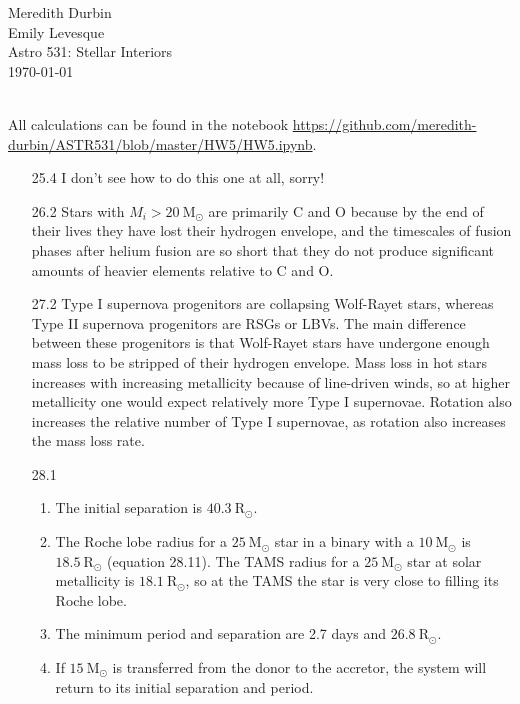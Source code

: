 \documentclass[11pt]{article}
\newcommand\rsol{\mathrm{R}_\odot}
\newcommand\msol{\mathrm{M}_\odot}
\begin{document}
\begin{flushright}Meredith Durbin\\
Emily Levesque\\
Astro 531: Stellar Interiors\\
\today\\

\end{flushright}

 \\[6pt]

All calculations can be found in the notebook \url{https://github.com/meredith-durbin/ASTR531/blob/master/HW5/HW5.ipynb}.

\begin{enumerate}

\item [25.4] I don't see how to do this one at all, sorry!
%	
%    

\item [26.2] 
	Stars with $M_i > 20~\msol$ are primarily C and O because by the end of their lives they have lost their hydrogen envelope, and the timescales of fusion phases after helium fusion are so short that they do not produce significant amounts of heavier elements relative to C and O.

\item [27.2]
	Type I supernova progenitors are collapsing Wolf-Rayet stars, whereas Type II supernova progenitors are RSGs or LBVs. The main difference between these progenitors is that Wolf-Rayet stars have undergone enough mass loss to be stripped of their hydrogen envelope. Mass loss in hot stars increases with increasing metallicity because of line-driven winds, so at higher metallicity one would expect relatively more Type I supernovae. Rotation also increases the relative number of Type I supernovae, as rotation also increases the mass loss rate.
    
\item [28.1]
	\begin{enumerate}
	
    \item The initial separation is $40.3~\rsol$.
    
    \item The Roche lobe radius for a $25~\msol$ star in a binary with a $10~\msol$ is $18.5~\rsol$ (equation 28.11). The TAMS radius for a $25~\msol$ star at solar metallicity is $18.1~\rsol$, so at the TAMS the star is very close to filling its Roche lobe. 
    
    \item The minimum period and separation are 2.7 days and $26.8~\rsol$.
    
    \item If $15~\msol$ is transferred from the donor to the accretor, the system will return to its initial separation and period.
    
    \end{enumerate}

\end{enumerate}
\end{document}
